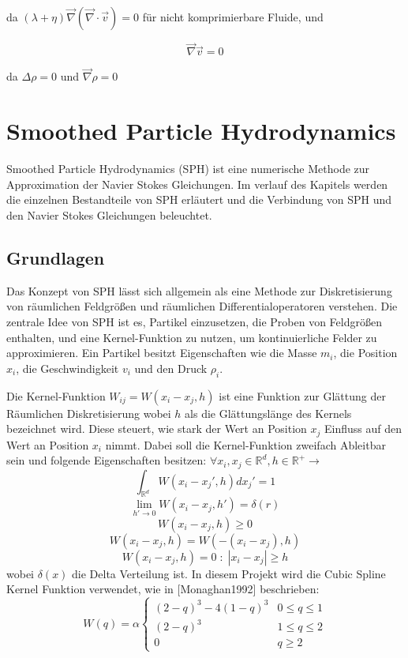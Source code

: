 \documentclass[a4paper, 12pt]{article}
\begin{document}
da \((\lambda + \eta)\vec{\nabla}(\vec{\nabla} \cdot \vec{v}) = 0\) für nicht komprimierbare Fluide, und

\begin{equation} \label{equ:einfachKontinuitätsgleichung}
	\vec{\nabla} \vec{v} = 0
\end{equation}

da \(\Delta \rho = 0\) und \(\vec{\nabla}\rho = 0\)

\section{Smoothed Particle Hydrodynamics} \label{section_2}
Smoothed Particle Hydrodynamics (SPH) ist eine numerische Methode zur Approximation der Navier Stokes Gleichungen. Im verlauf des Kapitels werden die einzelnen Bestandteile von SPH erläutert und die Verbindung von SPH und den Navier Stokes Gleichungen beleuchtet.

\subsection{Grundlagen}
Das Konzept von SPH lässt sich allgemein als eine Methode zur Diskretisierung von räumlichen Feldgrößen und räumlichen Differentialoperatoren verstehen. Die zentrale Idee von SPH ist es, Partikel einzusetzen, die Proben von Feldgrößen enthalten, und eine Kernel-Funktion zu nutzen, um kontinuierliche Felder zu approximieren. Ein Partikel besitzt Eigenschaften wie die Masse \( m_i \), die Position \( x_i \), die Geschwindigkeit \( v_i \) und den Druck \( \rho_i \).

Die Kernel-Funktion \(W_{ij} = W(x_i - x_j, h)\) ist eine Funktion zur Glättung der Räumlichen Diskretisierung wobei \(h\) als die Glättungslänge des Kernels bezeichnet wird. Diese steuert, wie stark der Wert an Position \(x_j\) Einfluss auf den Wert an Position \(x_i\) nimmt. Dabei soll die Kernel-Funktion zweifach Ableitbar sein und folgende Eigenschaften besitzen: \(\forall x_i, x_j \in \mathds{R}^d, h\in \mathds{R}^+ \rightarrow\) 
\[\int_{\mathds{R}^d} W(x_i - x_j', h) dx_j'  = 1\]
\[\lim_{h'\rightarrow 0} W(x_i - x_j, h') = \delta(r)\]
\[W(x_i - x_j, h) \geq 0\]
\[W(x_i - x_j, h) = W(-(x_i - x_j), h)\]
\[W(x_i - x_j, h) = 0\;:\; |x_i - x_j| \geq h\]
wobei \(\delta(x)\) die Delta Verteilung ist. 
In diesem Projekt wird die Cubic Spline Kernel Funktion verwendet, wie in [Monaghan1992] beschrieben:
\begin{equation*}
	W(q) = \alpha \begin{cases} 
	(2-q)^3 - 4(1-q)^3 & 0 \leq q \leq 1\\
	(2-q)^3 & 1 \leq q \leq 2 \\
	0 & q \geq 2 
	\end{cases}
\end{equation*}
	
\end{document}
